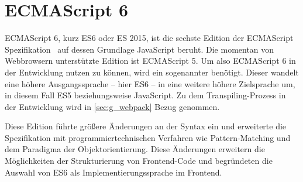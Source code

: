 \section{ECMAScript 6}
\label{sec:g_ecma_script_6}

ECMAScript 6, kurz ES6 oder ES 2015, ist die sechste Edition der ECMAScript
Spezifikation~\cite{es6} auf dessen Grundlage JavaScript beruht.  Die momentan
von Webbrowsern unterstützte Edition ist ECMAScript 5.  Um also ECMAScript 6 in
der Entwicklung nutzen zu können, wird ein sogenannter 
benötigt.  Dieser wandelt eine höhere Ausgangssprache -- hier ES6 -- in eine
weitere höhere Zielsprache um, in diesem Fall ES5 beziehungsweise JavaScript.
Zu dem Transpiling-Prozess in der Entwicklung wird in \cref{sec:g_webpack} Bezug
genommen.

Diese Edition führte größere Änderungen an der Syntax ein und erweiterte die
Spezifikation mit programmiertechnischen Verfahren wie Pattern-Matching und dem
Paradigma der Objektorientierung.  Diese Änderungen erweitern die Möglichkeiten
der Strukturierung von Frontend-Code und begründeten die Auswahl von ES6 als
Implementierungssprache im Frontend.






